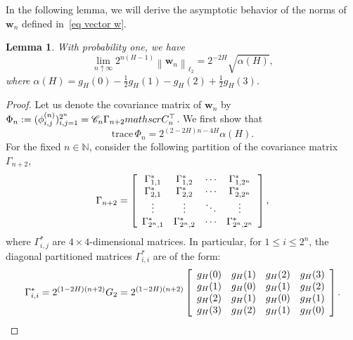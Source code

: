 \documentclass[12pt,reqno]{article}
\def\trace#1{\text{trace}\, #1}
\newcommand{\norm}[1]{\left\lVert {#1}\right\rVert}
\def\ua{\uparrow}
\numberwithin{equation}{section}
\newtheorem{lemma}[theorem]{Lemma}
\theoremstyle{definition}
\def\ua{\uparrow}
\newcommand{\bN}{\mathbb{N}}
\begin{document}
In the following lemma, we will derive the asymptotic behavior of the norms of $\bm w_n$ defined in~\eqref{eq vector w}.
 
\begin{lemma}\label{lemma fbm wn}
	With probability one, we have 
	\begin{equation*}
	\lim_{n \ua \infty}2^{n(H-1)}\norm{\bm w_n}_{\ell_2}=2^{-2H}\sqrt{\alpha(H)}, 
	\end{equation*}
	where $\alpha(H) = g_H(0) - \frac{1}{2}g_H(1) - g_H(2) +  \frac{1}{2}g_H(3)$.
\end{lemma}

\begin{proof}
	Let us denote the covariance matrix of $\bm w_n$ by $\Phi_n := (\phi^{(n)}_{i,j})_{i,j = 1}^{2^{n}} = \mathscr{C}_n \Gamma_{n+2}\\mathscr{C}_{n}^\top$. We first show that 
	\begin{equation*}
	\trace{\Phi_n}= 2^{(2-2H)n-4H}\alpha(H).
	\end{equation*}
	For the fixed $n \in \bN$, consider the following partition of the covariance matrix $\Gamma_{n+2}$, 
	\begin{equation}\label{eq Gamma n partition 2}
	\Gamma_{n+2} = \left[\begin{array}{c c c c}
	\Gamma^{\ast}_{1,1} & \Gamma^{\ast}_{1,2} &\cdots &\Gamma^{\ast}_{1,2^{n}}\\
	\Gamma^{\ast}_{2,1} & \Gamma^{\ast}_{2,2} &\cdots &\Gamma^{\ast}_{2,2^{n}}\\
	\vdots &\vdots & \ddots & \vdots\\
	\Gamma^{\ast}_{2^{n},1} & \Gamma^{\ast}_{2^{n},2} &\cdots &\Gamma^{\ast}_{2^{n},2^{n}}
	\end{array}\right],
	\end{equation}
	where $\Gamma^{\ast}_{i,j}$ are $4 \times 4$-dimensional matrices. In particular, for $1 \le i \le 2^{n}$, the diagonal partitioned matrices $\Gamma^{\ast}_{i,i}$ are of the form: 
	\begin{equation*}
	\Gamma^{\ast}_{i,i} = 2^{(1-2H)(n+2)}G_2 = 2^{(1-2H)(n+2)}\left[\begin{array}{c c c c}
	g_H(0) & g_H(1) & g_H(2) & g_H(3)\\
	g_H(1) & g_H(0) & g_H(1) & g_H(2)\\
	g_H(2) & g_H(1) & g_H(0) & g_H(1)\\
	g_H(3) & g_H(2) & g_H(1) & g_H(0)\\
	\end{array}
	\right].
	\end{equation*}

\end{proof}
\end{document}
